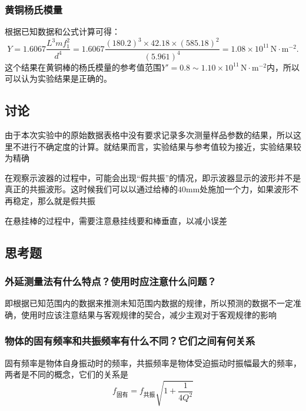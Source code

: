 \documentclass[zihao=5, UTF8]{article}
\theoremstyle{MyLineTheoremStyle} %
\theoremstyle{MyBlockTheoremStyle} %
\theoremstyle{MySubsubsectionStyle} %
\begin{document}
\subsubsection{黄铜杨氏模量}
根据已知数据和公式计算可得：
\[ Y = 1.6067 \frac{L^3 m f_1^2}{d^4} = 1.6067 \frac{(180.2)^3 \times 42.18 \times (585.18)^2}{(5.961)^4} = 1.08 \times 10^{11} \, \text{N}\cdot\text{m}^{-2}. \]
这个结果在黄铜棒的杨氏模量的参考值范围$Y' = 0.8 \sim 1.10 \times 10^{11} \, \text{N}\cdot\text{m}^{-2}$内，所以可以认为实验结果是正确的。

\subsection{讨论}
由于本次实验中的原始数据表格中没有要求记录多次测量样品参数的结果，所以这里不进行不确定度的计算。就结果而言，实验结果与参考值较为接近，实验结果较为精确

在观察示波器的过程中，可能会出现“假共振”的情况，即示波器显示的波形并不是真正的共振波形。这时候我们可以以通过给棒的$40$mm处施加一个力，如果波形不再稳定，那么就是假共振

在悬挂棒的过程中，需要注意悬挂线要和棒垂直，以减小误差
\subsection{思考题}
\subsubsection{外延测量法有什么特点？使用时应注意什么问题？}
即根据已知范围内的数据来推测未知范围内数据的规律，所以预测的数据不一定准确，使用时应该注意结果与客观规律的契合，减少主观对于客观规律的影响
\subsubsection{物体的固有频率和共振频率有什么不同？它们之间有何关系}
固有频率是物体自身振动时的频率，共振频率是物体受迫振动时振幅最大的频率，两者是不同的概念，它们的关系是
\[ f_\text{固有} = f_\text{共振} \sqrt{1 + \dfrac{1}{4Q^2}} \]

\end{document}
